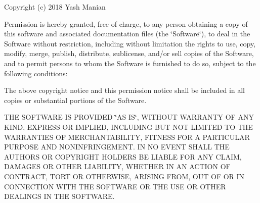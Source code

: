 Copyright (c) 2018 Yash Manian

Permission is hereby granted, free of charge, to any person obtaining a copy of this software and associated documentation files (the \char`\"{}\+Software\char`\"{}), to deal in the Software without restriction, including without limitation the rights to use, copy, modify, merge, publish, distribute, sublicense, and/or sell copies of the Software, and to permit persons to whom the Software is furnished to do so, subject to the following conditions\+:

The above copyright notice and this permission notice shall be included in all copies or substantial portions of the Software.

T\+HE S\+O\+F\+T\+W\+A\+RE IS P\+R\+O\+V\+I\+D\+ED \char`\"{}\+A\+S I\+S\char`\"{}, W\+I\+T\+H\+O\+UT W\+A\+R\+R\+A\+N\+TY OF A\+NY K\+I\+ND, E\+X\+P\+R\+E\+SS OR I\+M\+P\+L\+I\+ED, I\+N\+C\+L\+U\+D\+I\+NG B\+UT N\+OT L\+I\+M\+I\+T\+ED TO T\+HE W\+A\+R\+R\+A\+N\+T\+I\+ES OF M\+E\+R\+C\+H\+A\+N\+T\+A\+B\+I\+L\+I\+TY, F\+I\+T\+N\+E\+SS F\+OR A P\+A\+R\+T\+I\+C\+U\+L\+AR P\+U\+R\+P\+O\+SE A\+ND N\+O\+N\+I\+N\+F\+R\+I\+N\+G\+E\+M\+E\+NT. IN NO E\+V\+E\+NT S\+H\+A\+LL T\+HE A\+U\+T\+H\+O\+RS OR C\+O\+P\+Y\+R\+I\+G\+HT H\+O\+L\+D\+E\+RS BE L\+I\+A\+B\+LE F\+OR A\+NY C\+L\+A\+IM, D\+A\+M\+A\+G\+ES OR O\+T\+H\+ER L\+I\+A\+B\+I\+L\+I\+TY, W\+H\+E\+T\+H\+ER IN AN A\+C\+T\+I\+ON OF C\+O\+N\+T\+R\+A\+CT, T\+O\+RT OR O\+T\+H\+E\+R\+W\+I\+SE, A\+R\+I\+S\+I\+NG F\+R\+OM, O\+UT OF OR IN C\+O\+N\+N\+E\+C\+T\+I\+ON W\+I\+TH T\+HE S\+O\+F\+T\+W\+A\+RE OR T\+HE U\+SE OR O\+T\+H\+ER D\+E\+A\+L\+I\+N\+GS IN T\+HE S\+O\+F\+T\+W\+A\+RE. 